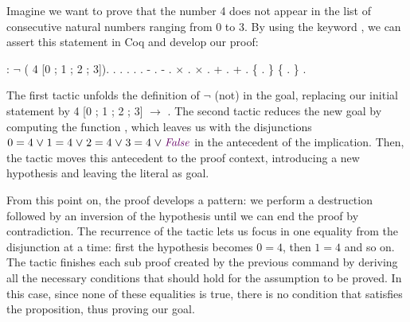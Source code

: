 Imagine we want to prove that the number 4 does not appear in the list of consecutive natural numbers ranging from 0 to 3. By using the keyword , we can assert this statement in Coq and develop our proof:

\begin{coqdoccode}
	\coqdocnoindent
	  : \ensuremath{\lnot} ( 4 [0 ; 1 ; 2 ; 3]).\coqdoceol
	\coqdocnoindent
	.\coqdoceol
	\coqdocindent{1.00em}
	 . . .\coqdoceol
	\coqdocindent{1.00em}
	 .\coqdoceol
	\coqdocindent{1.00em}
	-  .\coqdoceol
	\coqdocindent{1.00em}
	-  .\coqdoceol
	\coqdocindent{2.00em}
	\ensuremath{\times}  .\coqdoceol
	\coqdocindent{2.00em}
	\ensuremath{\times}  .\coqdoceol
	\coqdocindent{3.00em}
	+  .\coqdoceol
	\coqdocindent{3.00em}
	+  .\coqdoceol
	\coqdocindent{4.00em}
	\{  . \}\coqdoceol
	\coqdocindent{4.00em}
	\{ . \}\coqdoceol
	\coqdocnoindent
	.\coqdoceol
\end{coqdoccode}

The first tactic unfolds the definition of \ensuremath{\lnot} (not) in the goal, replacing our initial statement by  4 [0 ; 1 ; 2 ; 3] \ensuremath{\rightarrow} . The second tactic reduces the new goal by computing the function , which leaves us with the disjunctions $ 0 = 4 \lor 1 = 4 \lor 2 = 4 \lor 3 = 4 \lor \coqdocvar{False} $ in the antecedent of the implication. Then, the tactic  moves this antecedent to the proof context, introducing a new hypothesis  and leaving the literal  as goal.

From this point on, the proof develops a pattern: we perform a destruction followed by an inversion of the hypothesis until we can end the proof by contradiction. The recurrence of the tactic  lets us focus in one equality from the disjunction at a time: first the hypothesis becomes $ 0 = 4 $, then $ 1 = 4 $ and so on. The tactic  finishes each sub proof created by the previous command by deriving all the necessary conditions that should hold for the assumption to be proved. In this case, since none of these equalities is true, there is no condition that satisfies the proposition, thus proving our goal.

